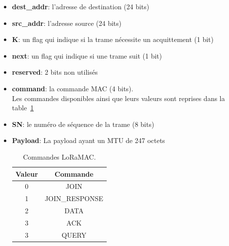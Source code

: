     \begin{itemize}
        \item \textbf{dest\_addr}: l'adresse de destination (24 bits)
        \item \textbf{src\_addr}: l'adresse source (24 bits)
        \item \textbf{K}: un flag  qui indique si la trame nécessite un acquittement (1 bit)
        \item \textbf{next}: un flag qui indique si une trame suit (1 bit)
        \item \textbf{reserved}: 2 bits non utilisés
        \item \textbf{command}: la commande MAC (4 bits).\\
        Les commandes disponibles ainsi que leurs valeurs sont reprises dans la table~\ref{tb:archi-loramac-command}
        \item \textbf{SN}: le numéro de séquence de la trame (8 bits)
        \item \textbf{Payload}: La payload ayant un MTU de 247 octets
        \begin{table}[H]
            \centering
            \begin{tabular}{|c|c|}
                \hline
                Valeur & Commande\\ \hline
                0 & JOIN\\ \hline
                1 & JOIN\_RESPONSE\\ \hline
                2 & DATA\\ \hline
                3 & ACK\\ \hline
                3 & QUERY\\ \hline
            \end{tabular}
            \caption{Commandes LoRaMAC.}
            \label{tb:archi-loramac-command}
        \end{table}
    \end{itemize}
